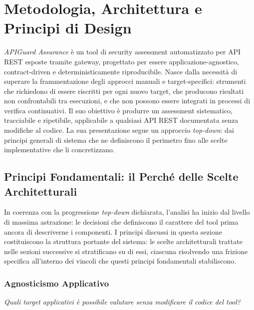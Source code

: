 ﻿%
\chapter{Metodologia, Architettura e Principi di Design}\label{chap:methodology}

\textit{APIGuard Assurance} è un tool di security assessment automatizzato per \gls{API} REST esposte tramite gateway, progettato per essere applicazione-agnostico, contract-driven e deterministicamente riproducibile. Nasce dalla necessità di superare la frammentazione degli approcci manuali e target-specifici: strumenti che richiedono di essere riscritti per ogni nuovo target, che producono risultati non confrontabili tra esecuzioni, e che non possono essere integrati in processi di verifica continuativi. Il suo obiettivo è produrre un assessment sistematico, tracciabile e ripetibile, applicabile a qualsiasi \gls{API} REST documentata senza modifiche al codice. La sua presentazione segue un approccio \textit{top-down}: dai principi generali di sistema che ne definiscono il perimetro fino alle scelte implementative che li concretizzano.

\section{Principi Fondamentali: il Perché delle Scelte Architetturali}%
\label{sec:principi-fondamentali}

In coerenza con la progressione \textit{top-down} dichiarata, l'analisi ha inizio dal livello di massima astrazione: le decisioni che definiscono il carattere del tool prima ancora di descriverne i componenti. I principi discussi in questa sezione costituiscono la struttura portante del sistema: le scelte architetturali trattate nelle sezioni successive si stratificano su di essi, ciascuna risolvendo una frizione specifica all'interno dei vincoli che questi principi fondamentali stabiliscono.


\subsection{Agnosticismo Applicativo}\label{subsec:agnosticismo}

\textit{Quali target applicativi è possibile valutare senza modificare il codice del tool?}

